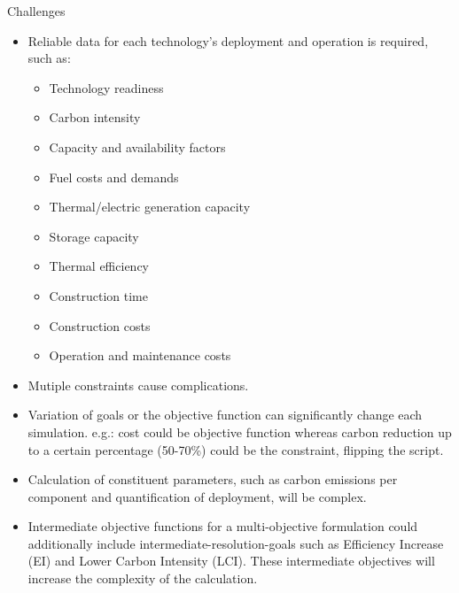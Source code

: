 \documentclass[final]{beamer}
\newlength{\onecolwid}
\newlength{\threecolwid}
\begin{document}
\begin{frame}[t]
\begin{columns}[t,totalwidth=\threecolwid]
\begin{column}{\onecolwid}
\begin{block}{Challenges}

 \begin{itemize}
   \item Reliable data for each technology's deployment and operation is required, such as:
    \begin{itemize}
    
     \item \normalsize Technology readiness
     
     \item Carbon intensity
     
     \item Capacity and availability factors
     
     \item Fuel costs and demands
     
     \item Thermal/electric generation capacity
     
     \item Storage capacity
     
     \item Thermal efficiency
     
     \item Construction time
     
     \item Construction costs
     
     \item Operation and maintenance costs\\
    
    
    \end{itemize}
    
   
   \item Mutiple constraints cause complications.
   
   \item Variation of goals or the objective function can significantly change each simulation. e.g.: cost could be objective function whereas carbon reduction up to a certain percentage (50-70\%) could be the constraint, flipping the script.
   
   \item Calculation of constituent parameters, such as carbon emissions per component and quantification of deployment, will be complex.
   
   \item Intermediate objective functions for a multi-objective formulation could additionally include intermediate-resolution-goals such as Efficiency Increase (EI) and Lower Carbon Intensity (LCI). These intermediate objectives will increase the complexity of the calculation.
 

\end{itemize}
\end{block}
\end{column}
\end{columns}
\end{frame}
\end{document}
